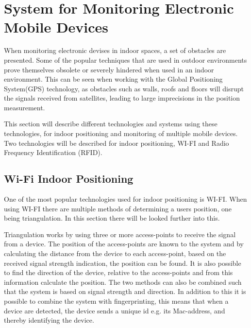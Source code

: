 \section{System for Monitoring Electronic Mobile Devices}\label{sec:monitoring}
When monitoring electronic devises in indoor spaces, a set of obstacles are presented. Some of the popular techniques that are used in outdoor environments prove themselves obsolete or severely hindered when used in an indoor environment.  This can be seen when working with the Global Positioning System(GPS) technology, as obstacles such as walls, roofs and floors will disrupt the signals received from satellites, leading to large imprecisions in the position measurement.

This section will describe different technologies and systems using these technologies, for indoor positioning and monitoring of multiple mobile devices. Two technologies will be described for indoor positioning, WI-FI and Radio Frequency Identification (RFID).  

\subsection{Wi-Fi Indoor Positioning}
One of the most popular technologies used for indoor positioning is WI-FI. When using WI-FI there are multiple methods of determining a users position, one being triangulation. In this section there will be looked further into this. 


Triangulation works by using three or more access-points to receive the signal from a device. The position of the access-points are known to the system and by calculating the distance from the device to each access-point, based on the received signal strength indication, the position can be found. It is also possible to find the direction of the device, relative to the access-points and from this information calculate the position. The two methods can also be combined such that the system is based on signal strength and direction. In addition to this it is possible to combine the system with fingerprinting, this means that when a device are detected, the device sends a unique id e.g. its Mac-address, and thereby identifying the device\cite{triang_n_finger}. %

